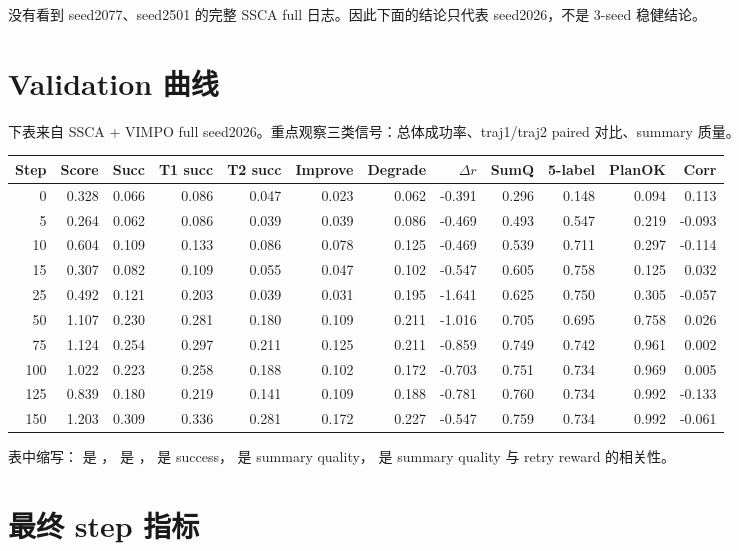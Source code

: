 \documentclass[10pt]{ctexart}
\begin{document}
没有看到 seed2077、seed2501 的完整 SSCA full 日志。因此下面的结论只代表 seed2026，不是 3-seed 稳健结论。

\section{Validation 曲线}
下表来自 SSCA + VIMPO full seed2026。重点观察三类信号：总体成功率、traj1/traj2 paired 对比、summary 质量。

\begin{center}
\scriptsize
\begin{tabularx}{\linewidth}{r r r r r r r r r r r r}
\toprule
Step & Score & Succ & T1 succ & T2 succ & Improve & Degrade & $\Delta r$ & SumQ & 5-label & PlanOK & Corr \\
\midrule
0 & 0.328 & 0.066 & 0.086 & 0.047 & 0.023 & 0.062 & -0.391 & 0.296 & 0.148 & 0.094 & 0.113 \\
5 & 0.264 & 0.062 & 0.086 & 0.039 & 0.039 & 0.086 & -0.469 & 0.493 & 0.547 & 0.219 & -0.093 \\
10 & 0.604 & 0.109 & 0.133 & 0.086 & 0.078 & 0.125 & -0.469 & 0.539 & 0.711 & 0.297 & -0.114 \\
15 & 0.307 & 0.082 & 0.109 & 0.055 & 0.047 & 0.102 & -0.547 & 0.605 & 0.758 & 0.125 & 0.032 \\
25 & 0.492 & 0.121 & 0.203 & 0.039 & 0.031 & 0.195 & -1.641 & 0.625 & 0.750 & 0.305 & -0.057 \\
50 & 1.107 & 0.230 & 0.281 & 0.180 & 0.109 & 0.211 & -1.016 & 0.705 & 0.695 & 0.758 & 0.026 \\
75 & 1.124 & 0.254 & 0.297 & 0.211 & 0.125 & 0.211 & -0.859 & 0.749 & 0.742 & 0.961 & 0.002 \\
100 & 1.022 & 0.223 & 0.258 & 0.188 & 0.102 & 0.172 & -0.703 & 0.751 & 0.734 & 0.969 & 0.005 \\
125 & 0.839 & 0.180 & 0.219 & 0.141 & 0.109 & 0.188 & -0.781 & 0.760 & 0.734 & 0.992 & -0.133 \\
150 & 1.203 & 0.309 & 0.336 & 0.281 & 0.172 & 0.227 & -0.547 & 0.759 & 0.734 & 0.992 & -0.061 \\
\bottomrule
\end{tabularx}
\end{center}

表中缩写： 是 ， 是 ， 是  success， 是 summary quality， 是 summary quality 与 retry reward 的相关性。

\section{最终 step 指标}
\end{document}
